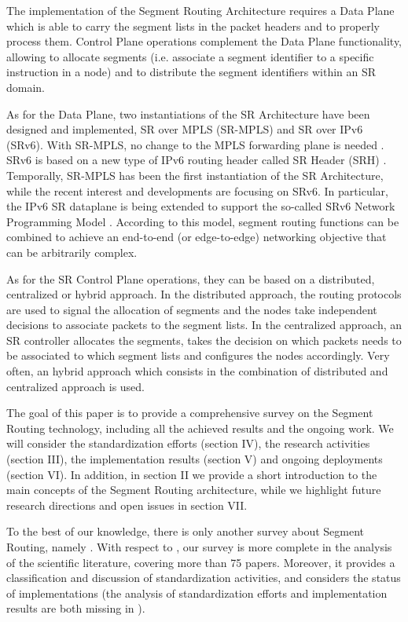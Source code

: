 The implementation of the Segment Routing Architecture requires a Data Plane which is able to carry the segment lists in the packet headers and to properly process them. Control Plane operations complement the Data Plane functionality, allowing to allocate segments (i.e. associate a segment identifier to a specific instruction in a node) and to distribute the segment identifiers within an SR domain.

As for the Data Plane, two instantiations of the SR Architecture have been designed and implemented, SR over MPLS (SR-MPLS) and SR over IPv6 (SRv6). With SR-MPLS, no change to the MPLS forwarding plane is needed \cite{id-segment-routing-mpls}. SRv6 is based on a new type of IPv6 routing header called SR Header (SRH) \cite{draft-srh}. Temporally, SR-MPLS has been the first instantiation of the SR Architecture, while the recent interest and developments are focusing on SRv6. In particular, the IPv6 SR dataplane is being extended to support the so-called SRv6 Network Programming Model \cite{id-srv6-network-prog}. According to this model, segment routing functions can be combined to achieve an end-to-end (or edge-to-edge) networking objective that can be arbitrarily complex. 

As for the SR Control Plane operations, they can be based on a distributed, centralized or hybrid approach. In the distributed approach, the routing protocols are used to signal the allocation of segments and the nodes take independent decisions to associate packets to the segment lists. In the centralized approach, an SR controller allocates the segments, takes the decision on which packets needs to be associated to which segment lists and configures the nodes accordingly. Very often, an hybrid approach which consists in the combination of distributed and centralized approach is used. 

The goal of this paper is to provide a comprehensive survey on the Segment Routing technology, including all the achieved results and the ongoing work. We will consider the standardization efforts (section IV), the research activities (section III), the implementation results (section V) and ongoing deployments (section VI). In addition, in section II we provide a short introduction to the main concepts of the Segment Routing architecture, while we highlight future research directions and open issues in section VII.  

To the best of our knowledge, there is only another survey about Segment Routing, namely \cite{abdullah2018segment}. With respect to \cite{abdullah2018segment}, our survey is more complete in the analysis of the scientific literature, covering more than 75 papers. Moreover, it provides a classification and discussion of standardization activities, and considers the status of implementations  (the analysis of standardization efforts and implementation results are both missing in \cite{abdullah2018segment}). 